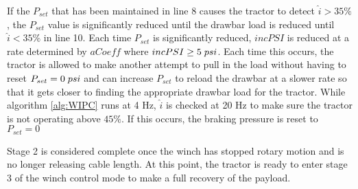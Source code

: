 If the $P_{set}$ that has been maintained in line 8 causes the tractor to detect $\hat{i} > 35\%$, the $P_{set}$ value is significantly reduced until the drawbar load is reduced until $\hat{i} < 35\%$ in line 10. Each time $P_{set}$ is significantly reduced, $incPSI$ is reduced at a rate determined by $aCoeff$ where $incPSI \geq 5\hspace{1mm}psi$. Each time this occurs, the tractor is allowed to make another attempt to pull in the load without having to reset $P_{set} = 0\hspace{1mm}psi$ and can increase $P_{set}$ to reload the drawbar at a slower rate so that it gets closer to finding the appropriate drawbar load for the tractor. While algorithm \ref{alg:WIPC} runs at 4 Hz, $\hat{i}$ is checked at 20 Hz to make sure the tractor is not operating above $45\%$. If this occurs, the braking pressure is reset to $P_{set} = 0$ 

Stage 2 is considered complete once the winch has stopped rotary motion and is no longer releasing cable length. At this point, the tractor is ready to enter stage 3 of the winch control mode to make a full recovery of the payload.